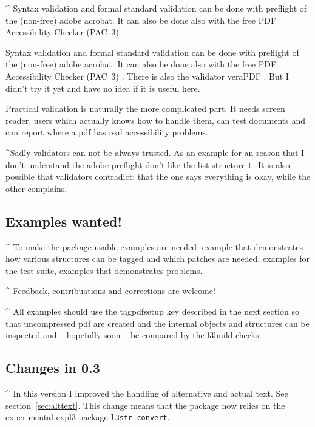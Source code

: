 \documentclass[DIV=12,parskip=half-,bibliography=totoc]{scrartcl}
\begin{document}
\TagP^
Syntax validation and formal standard validation can be done with preflight of the (non-free) adobe acrobat.
It can also be done also with the free PDF Accessibility Checker (PAC~3) \parencite{pac3}.

\TagP
Syntax validation and formal standard validation can be done with preflight of the (non-free) adobe acrobat.
It can also be done also with the free PDF Accessibility Checker (PAC~3) \parencite{pac3}.
There is also the validator veraPDF \parencite{verapdf}. But I didn't try it yet and have no idea if it is useful here.

\TagP Practical validation is naturally the more complicated part. It needs screen reader, users which actually knows how to handle them, can test documents and can report where a pdf has real accessibility problems.\TagPend




\TagP^Sadly validators can not be always trusted. As an example for an reason that I don't understand the adobe preflight don't like the list structure \texttt{L}.
It is also possible that validators contradict: that the one says everything is okay, while the other complains.\TagPend


\subsection{Examples wanted!}
\TagP^ To make the package usable examples are needed: example that demonstrates how various structures can be tagged and which patches are needed, examples for the test suite, examples that demonstrates problems.\TagPend

\begin{tcolorbox}[]
\TagP^ Feedback, contribuations and corrections are welcome!\TagPend
\end{tcolorbox}

\TagP^ All examples should use the tagpdfsetup key  described in the next section so that uncompressed pdf are created and the internal objects and structures can be inspected and -- hopefully soon -- be compared by the l3build checks.%
\TagPend


\subsection{Changes in 0.3}

\TagP^
In this version I improved the handling of alternative and actual text. See section~\ref{sec:alttext}. This change means that the package now relies on the experimental expl3 package \texttt{l3str-convert}.
\end{document}
